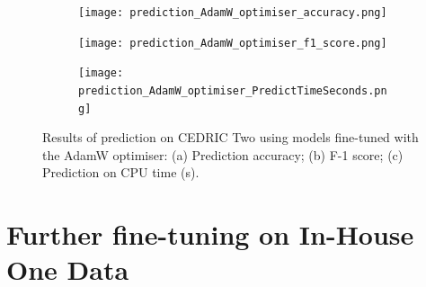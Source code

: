 \documentclass[a4paper,12pt]{article}
\newcommand{\figwidthh}{0.48\textwidth}
\newcommand{\inghamTwo}{CEDRIC Two\xspace}  %
\begin{document}
\begin{figure}[p]
	\begin{center}
		\begin{subfigure}[b]{\figwidthh}
			\caption{} 
			\texttt{[image: prediction\_AdamW\_optimiser\_accuracy.png]}
		\end{subfigure}
        \hfill
		\begin{subfigure}[b]{\figwidthh}
			\caption{}
			\texttt{[image: prediction\_AdamW\_optimiser\_f1\_score.png]}
		\end{subfigure}
        \hfill
		\begin{subfigure}[b]{\figwidthh}
			\caption{}
			\texttt{[image: prediction\_AdamW\_optimiser\_PredictTimeSeconds.png]}
		\end{subfigure}
	\end{center}
	\caption{Results of prediction on \inghamTwo using models fine-tuned with the AdamW optimiser: (a) Prediction accuracy; (b) F-1 score; (c) Prediction on CPU time (s). 
	} 
	\label{fig:res_predict1}
\end{figure}



\newpage



\section{Further fine-tuning on In-House One Data}
\end{document}
